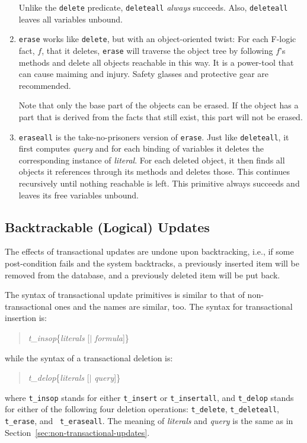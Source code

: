 \documentclass[11pt]{article}
\newcommand{\fl}{\mbox{F-logic}\xspace}
\begin{document}
\begin{enumerate}
  \smallskip
  
  Unlike the {\tt delete} predicate, {\tt deleteall} \emph{always}
  succeeds. Also, {\tt deleteall} leaves all variables unbound.
  
\item {\tt erase} works like {\tt delete}, but with an object-oriented
  twist: For each \fl fact, $f$, that it deletes, {\tt erase} will
  traverse the object tree by following $f$'s methods and delete all
  objects reachable in this way. It is a power-tool that can cause
  maiming and injury. Safety glasses and protective gear are
  recommended.
  
  Note that only the base part of the objects can be erased. If the
  object has a part that is derived from the facts that still exist, this
  part will not be erased.
  
\item {\tt eraseall} is the take-no-prisoners version of {\tt erase}.
  Just like {\tt deleteall}, it first computes \emph{query} and for each
  binding of variables it deletes the corresponding instance of
  \emph{literal}. For each deleted object, it then finds all objects it
  references through its methods and deletes those. This continues
  recursively until nothing reachable is left.  This primitive always
  succeeds and leaves its free variables unbound.
\end{enumerate}


\subsection{Backtrackable (Logical) Updates}


%
The effects of transactional updates are undone upon backtracking, i.e., if
some post-condition fails and the system backtracks, a previously inserted
item will be removed from the database, and a previously deleted item will be
put back.

%
The syntax of transactional update primitives is similar to that of
non-transactional ones and the names are similar, too.  The syntax for
transactional insertion is:
\begin{quote}
\emph{t\_insop}\{\emph{literals} [$\mid$ \emph{formula}]\}
\end{quote}
while the syntax of a transactional deletion is:
\begin{quote}
\emph{t\_delop}\{\emph{literals} [$\mid$ \emph{query}]\}
\end{quote}
where {\tt t\_insop} stands for either {\tt t\_insert} or {\tt t\_insertall},
and {\tt t\_delop} stands for either of the following four deletion
operations: {\tt t\_delete}, {\tt t\_deleteall}, {\tt t\_erase}, and {\tt
  t\_eraseall}. The meaning of {\it literals} and {\it query} is
the same as in Section~\ref{sec:non-transactional-updates}.
\end{document}

